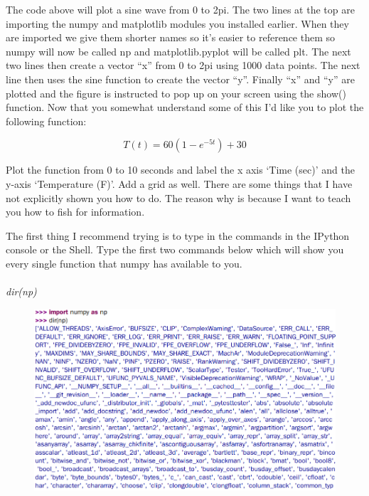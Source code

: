 The code above will plot a sine wave from 0 to 2pi. The two lines at
the top are importing the numpy and matplotlib modules you installed
earlier. When they are imported we give them shorter names so it’s
easier to reference them so numpy will now be called np and
matplotlib.pyplot will be called plt. The next two lines then create a
vector “x” from 0 to 2pi using 1000 data points. The next line then
uses the sine function to create the vector “y”. Finally “x” and “y”
are plotted and the figure is instructed to pop up on your screen
using the show() function. Now that you somewhat understand some of
this I’d like you to plot the following function: 

\begin{equation}
  T(t) = 60(1-e^{-5t})+30
\end{equation}

Plot the function from 0 to 10 seconds and label the x axis ‘Time
(sec)’ and the y-axis ‘Temperature (F)’. Add a grid as well. There are
some things that I have not explicitly shown you how to do. The reason
why is because I want to teach you how to fish for information.  

The first thing I recommend trying is to type in the commands in the
IPython console or the Shell. Type the first two commands below which
will show you every single function that numpy has available to you. 
\ \\

\\
{\it dir(np)}
\ \\

\begin{figure}[H]
  \begin{center}
    \includegraphics[width=\textwidth]{Figures/dir.png}
  \end{center}
\end{figure}

